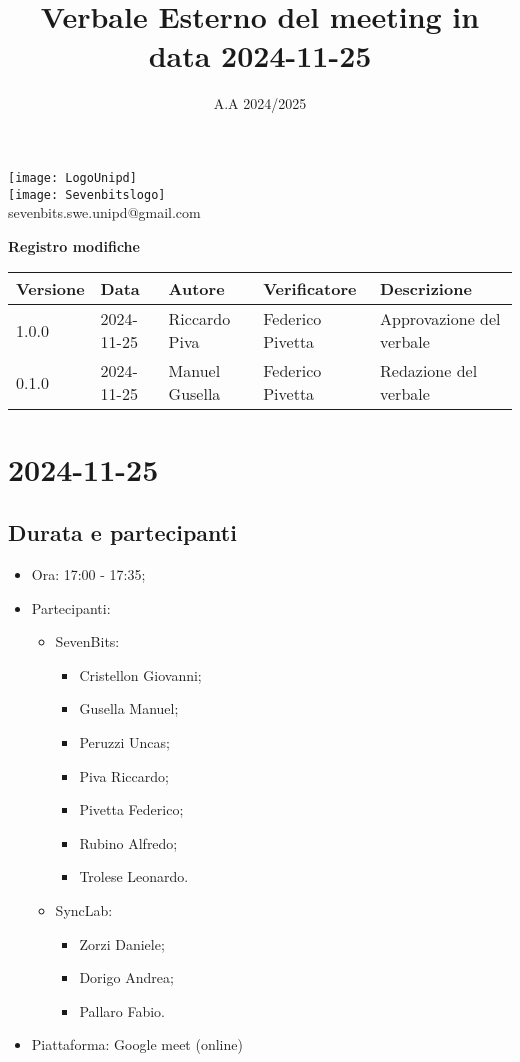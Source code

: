 \documentclass[12pt]{article}
\title{Verbale Esterno del meeting in data 2024-11-25}
\date{A.A 2024/2025}
\begin{document}
\maketitle
\begin{center}
\texttt{[image: LogoUnipd]}\\
\texttt{[image: Sevenbitslogo]}\\
sevenbits.swe.unipd@gmail.com\\
\vspace{2mm}

\textbf{Registro modifiche}\\
\vspace{2mm}
\begin{tabularx}{\textwidth}{|l|l|l|l|X|}
\hline
\textbf{Versione} & \textbf{Data} & \textbf{Autore} & \textbf{Verificatore} & \textbf{Descrizione} \\
\hline
1.0.0 & 2024-11-25 & Riccardo Piva & Federico Pivetta & Approvazione del verbale\\
\hline
0.1.0 & 2024-11-25 & Manuel Gusella & Federico Pivetta & Redazione del verbale\\
\hline

\end{tabularx}
\end{center}
\newpage
\tableofcontents
\newpage
\section{2024-11-25}
\subsection{Durata e partecipanti}
\begin{itemize}
\item Ora: 17:00 - 17:35;
\item Partecipanti: 	
	\begin{itemize}
        \item SevenBits:
        \begin{itemize}
        	\item Cristellon Giovanni;
			\item Gusella Manuel;
			\item Peruzzi Uncas;
			\item Piva Riccardo;
			\item Pivetta Federico;
			\item Rubino Alfredo;
			\item Trolese Leonardo.
		\end{itemize}
		\item SyncLab:
		\begin{itemize}
			\item Zorzi Daniele;
			\item Dorigo Andrea;
			\item Pallaro Fabio.
		\end{itemize}
	\end{itemize}
\item Piattaforma: Google meet (online)
\end{itemize}
\end{document}
